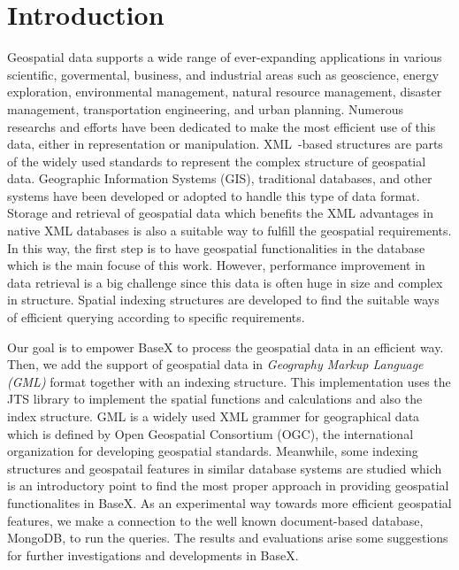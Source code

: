 \documentclass[a4paper,12pt]{article}
\begin{document}
\section{Introduction}
\setcounter{page}{1}
Geospatial data supports a wide range of ever-expanding applications in various scientific, govermental, business, and industrial areas such as geoscience, energy exploration, environmental management, natural resource management, disaster management, transportation engineering, and urban planning. 
Numerous researchs and efforts have been dedicated to make the most efficient use of this data, either in representation or manipulation. 
XML~\cite{www/xml}-based structures are parts of the widely used standards to represent the complex structure of geospatial data. 
Geographic Information Systems (GIS), traditional databases, and other systems have been developed or adopted to handle this type of data format. 
Storage and retrieval of geospatial data which benefits the XML advantages in native XML databases is also a suitable way to fulfill the geospatial requirements. 
In this way, the first step is to have geospatial functionalities in the database which is the main focuse of this work.
However, performance improvement in data retrieval is a big challenge since this data is often huge in size and complex in structure. 
Spatial indexing structures are developed to find the suitable ways of efficient querying according to specific requirements. 

Our goal is to empower BaseX to process the geospatial data in an efficient way. 
Then, we add the support of geospatial data in \emph{Geography Markup Language (GML)} format together with an indexing structure. This implementation uses the JTS library to implement the spatial functions and calculations and also the index structure.
GML is a widely used XML grammer for geographical data which is defined by Open Geospatial Consortium (OGC), the international organization for developing geospatial standards.
Meanwhile, some indexing structures and geospatail features in similar database systems are studied which is an introductory point 
to find the most proper approach in providing geospatial functionalites in BaseX. 
As an experimental way towards more efficient geospatial features, 
we make a connection to the well known document-based database, MongoDB, to run the queries. The results and evaluations arise some suggestions for further investigations and developments in BaseX. 
\end{document}
